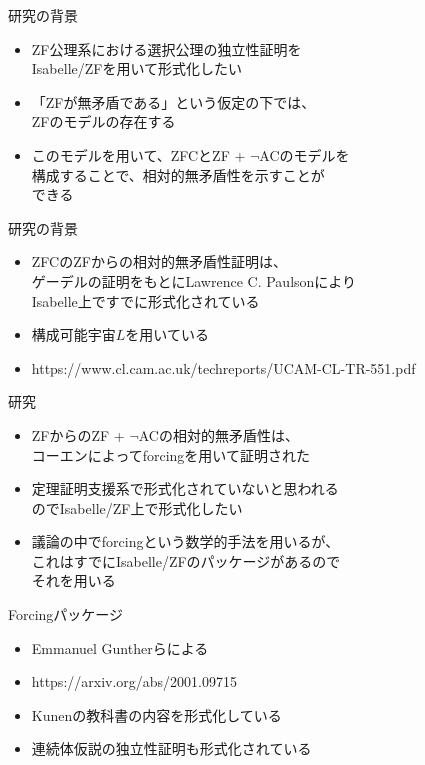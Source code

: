 \documentclass[17pt,aspectratio=169,xcolor=dvipsnames,table,dvipdfmx]{beamer}
\theoremstyle{definition}
\begin{document}
\begin{frame} {研究の背景}
    \begin{itemize}
        \item ZF公理系における選択公理の独立性証明を\\Isabelle/ZFを用いて形式化したい
        \item 「ZFが無矛盾である」という仮定の下では、\\ZFのモデルの存在する
        \item このモデルを用いて、ZFCとZF + $\neg$ACのモデルを\\構成することで、相対的無矛盾性を示すことが\\できる
    \end{itemize}
\end{frame}

\begin{frame} {研究の背景}
    \begin{itemize}
        \item ZFCのZFからの相対的無矛盾性証明は、\\
              ゲーデルの証明をもとにLawrence C. Paulsonにより\\
              Isabelle上ですでに形式化されている
        \item 構成可能宇宙$L$を用いている
        \item https://www.cl.cam.ac.uk/techreports/UCAM-CL-TR-551.pdf
    \end{itemize}
\end{frame}

\begin{frame} {研究}
    \begin{itemize}
        \item ZFからのZF + $\neg$ACの相対的無矛盾性は、\\コーエンによってforcingを用いて証明された
        \item 定理証明支援系で形式化されていないと思われる\\のでIsabelle/ZF上で形式化したい
        \item 議論の中でforcingという数学的手法を用いるが、\\これはすでにIsabelle/ZFのパッケージがあるので\\それを用いる
    \end{itemize}
\end{frame}

\begin{frame} {Forcingパッケージ}
    \begin{itemize}
        \item Emmanuel Guntherらによる
        \item https://arxiv.org/abs/2001.09715
        \item Kunenの教科書の内容を形式化している
        \item 連続体仮説の独立性証明も形式化されている
    \end{itemize}
\end{frame}
\end{document}
